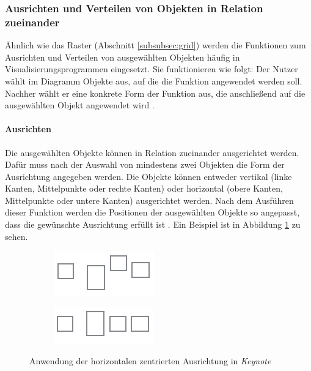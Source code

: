 \subsubsection{Ausrichten und Verteilen von Objekten in Relation zueinander}
\label{subsubsec:alignment-and-distribution}

Ähnlich wie das Raster (Abschnitt \ref{subsubsec:grid}) werden die Funktionen zum Ausrichten und Verteilen von ausgewählten Objekten häufig in Visualisierungsprogrammen eingesetzt. Sie funktionieren wie folgt: Der Nutzer wählt im Diagramm Objekte aus, auf die die Funktion angewendet werden soll. Nachher wählt er eine konkrete Form der Funktion aus, die anschließend auf die ausgewählten Objekt angewendet wird \cite{11Keynote}.

\paragraph{Ausrichten}

Die ausgewählten Objekte können in Relation zueinander ausgerichtet werden. Dafür muss nach der Auswahl von mindestens zwei Objekten die Form der Ausrichtung angegeben werden. Die Objekte können entweder vertikal (linke Kanten, Mittelpunkte oder rechte Kanten) oder horizontal (obere Kanten, Mittelpunkte oder untere Kanten) ausgerichtet werden. Nach dem Ausführen dieser Funktion werden die Positionen der ausgewählten Objekte so angepasst, dass die gewünschte Ausrichtung erfüllt ist \cite{11Keynote, 08OmniGraffle}. Ein Beispiel ist in Abbildung \ref{fig:keynote-horizontal-alignment} zu sehen.

\begin{figure}[hbt]
    \newcommand{\subfigurewidth}{0.5\textwidth}
    \begin{subfigure}{\subfigurewidth}
        \centering
        \includegraphics{assets/keynote-horizontal-alignment-a}
        \caption{}
    \end{subfigure}
    \begin{subfigure}{\subfigurewidth}
        \centering
        \includegraphics{assets/keynote-horizontal-alignment-b}
        \caption{}
    \end{subfigure}
    \caption{Anwendung der horizontalen zentrierten Ausrichtung in \textit{Keynote}}
    \label{fig:keynote-horizontal-alignment}
\end{figure}

